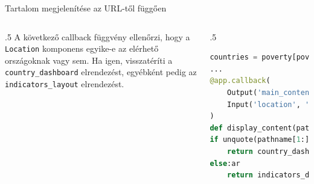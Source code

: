 \documentclass[english, aspectratio=169]{beamer}
\begin{document}
\begin{frame}[fragile]{Tartalom megjelenítése az URL-től függően}
	\begin{columns}
		\begin{column}{.5\textwidth}
			A következő callback függvény ellenőrzi, hogy a \texttt{Location} komponens egyike-e az elérhető országoknak vagy sem. Ha igen, visszatéríti a \texttt{country\_dashboard} elrendezést, egyébként pedig az \texttt{indicators\_layout} elrendezést. 
		\end{column}
		\begin{column}{.5\textwidth}
			\begin{lstlisting}[language=python]
countries = poverty[poverty['is_country']]['Country Name'].drop_duplicates().sort_values().tolist()
...
@app.callback(
	Output('main_content', 'children'),
	Input('location', 'pathname')
)
def display_content(pathname):
if unquote(pathname[1:]) in countries:
	return country_dashboard
else:ar
	return indicators_dashboard
			\end{lstlisting}
		\end{column}
	\end{columns}
\end{frame}
\end{document}
